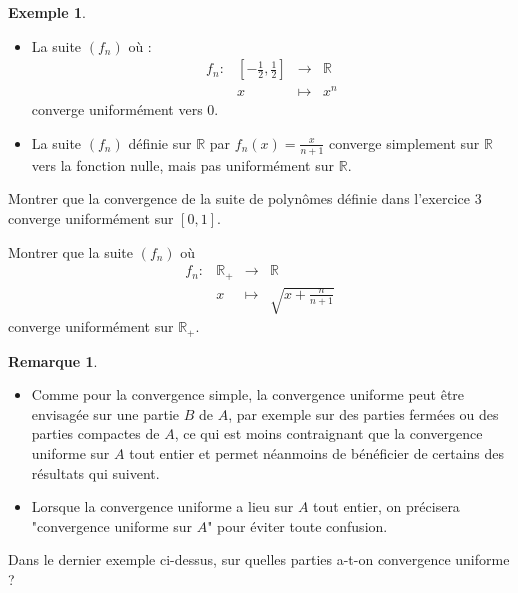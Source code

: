 \documentclass[french]{article}
\newcommand{\R}{\mathbb{R}}
\theoremstyle{plain}
\theoremstyle{definition}
\newtheorem*{ex}{Exemple}
\newtheorem*{rmq}{Remarque}
\theoremstyle{remark}
\begin{document}
\begin{ex}
	\begin{itemize}
		\item La suite $(f_n)$ où :
		$$\begin{array}{lrcl}
			f_n:&\displaystyle\left[-\frac{1}{2},\frac{1}{2}\right]&\longrightarrow&\R\\
			&x&\longmapsto&x^n
		\end{array}$$ converge uniformément vers $0$.
		\item La suite $(f_n)$ définie sur $\R$ par $f_n(x)=\displaystyle\frac{x}{n+1}$ converge simplement sur $\R$ vers la fonction nulle, mais pas uniformément sur $\R$. %
	\end{itemize}
\end{ex}

\begin{exo}
	Montrer que la convergence de la suite de polynômes définie dans l'exercice $3$ converge uniformément sur $[0,1]$.
\end{exo}

\begin{exo}
	Montrer que la suite $(f_n)$ où $$\begin{array}{lrcl}
		f_n:&\R_+&\longrightarrow&\R\\
		&x&\longmapsto&\displaystyle\sqrt{x+\frac{n}{n+1}}
	\end{array}$$ converge uniformément sur $\R_+$.
\end{exo}

\begin{rmq}
	\begin{itemize}
		\item Comme pour la convergence simple, la convergence uniforme peut être envisagée sur une partie $B$ de $A$, par exemple sur des parties fermées ou des parties compactes de $A$, ce qui est moins contraignant que la convergence uniforme sur $A$ tout entier et permet néanmoins de bénéficier de certains des résultats qui suivent.
		\item Lorsque la convergence uniforme a lieu sur $A$ tout entier, on précisera "convergence uniforme sur $A$" pour éviter toute confusion.
	\end{itemize}
\end{rmq}

\begin{exo}
	Dans le dernier exemple ci-dessus, sur quelles parties a-t-on convergence uniforme ?
\end{exo}
\end{document}
